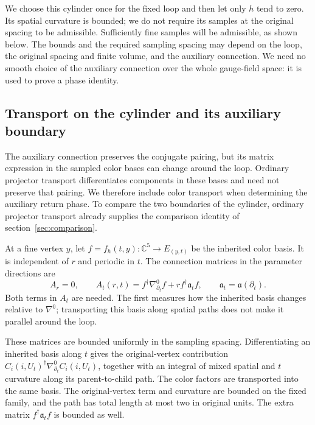 \documentclass[11pt,a4paper]{article}
\theoremstyle{remark}
\begin{document}
We choose this cylinder once for the fixed loop and then let only $h$
tend to zero. Its spatial curvature is bounded; we do not require its
samples at the original spacing to be admissible. Sufficiently fine
samples will be admissible, as shown below. The bounds and the required sampling
spacing may depend on the loop, the original spacing and finite volume,
and the auxiliary connection. We need no smooth choice of the auxiliary
connection over the whole gauge-field space: it is used to prove a phase
identity.

\subsection{Transport on the cylinder and its auxiliary boundary}

The auxiliary connection preserves the conjugate pairing, but its matrix
expression in the sampled color bases can change around the loop.
Ordinary projector transport differentiates components in these bases and
need not preserve that pairing. We therefore include color transport when
determining the auxiliary return phase. To compare the two boundaries of
the cylinder, ordinary projector transport already supplies the comparison
identity of section~\ref{sec:comparison}.

At a fine vertex $y$, let $f=f_h(t,y):\mathbb C^5\to E_{(y,t)}$
be the inherited color basis. It is independent of $r$ and periodic in
$t$. The connection matrices in the parameter directions are
\begin{equation}
 A_r=0,\qquad
 A_t(r,t)=f^\dagger\nabla^0_{\partial_t}f
                       +r f^\dagger\mathfrak a_t f,
 \qquad \mathfrak a_t=\mathfrak a(\partial_t).
 \label{eq:sampled-parameter-potentials}
\end{equation}
Both terms in $A_t$ are needed. The first measures how the inherited
basis changes relative to $\nabla^0$; transporting this basis along
spatial paths does not make it parallel around the loop.

These matrices are bounded uniformly in the sampling spacing.
Differentiating an inherited basis along $t$ gives the original-vertex
contribution $C_i(i,U_t)^\dagger\nabla^0_{\partial_t}C_i(i,U_t)$,
together with an integral of mixed spatial and $t$ curvature along its
parent-to-child path. The color factors are transported into the same
basis. The original-vertex term and curvature are bounded on the fixed
family, and the path has total length at most two in original units.
The extra matrix $f^\dagger\mathfrak a_t f$ is bounded as well.
\end{document}
